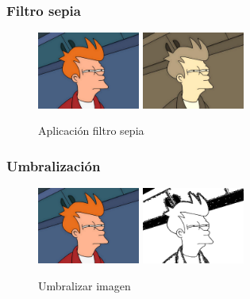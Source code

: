 \subsubsection{Filtro sepia}
\vskip0.3cm
\begin{figure}[H]
 \centering
  \includegraphics[width=0.3\textwidth]{imagenes/Fry.jpg}
  \includegraphics[width=0.3\textwidth]{imagenes/frySepia.jpg}
 \caption{Aplicación filtro sepia}
 \label{diseño}
\end{figure}
\subsubsection{Umbralización}
\vskip0.3cm
\begin{figure}[H]
 \centering
  \includegraphics[width=0.3\textwidth]{imagenes/Fry.jpg}
  \includegraphics[width=0.3\textwidth]{imagenes/fryUmbralizado.jpg}
 \caption{Umbralizar imagen}
 \label{diseño}
\end{figure}
